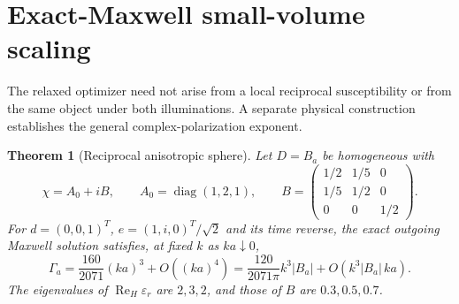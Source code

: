 \documentclass[11pt]{article}
\newtheorem{theorem}{Theorem}[section]
\newcommand{\ReH}{\operatorname{Re}_{\!H}}
\newcommand{\abs}[1]{\lvert #1\rvert}
\begin{document}
\section{Exact-Maxwell small-volume scaling}\label{sec:sphere}
The relaxed optimizer need not arise from a local reciprocal susceptibility or from the same object under both illuminations. A separate physical construction establishes the general complex-polarization exponent.

\begin{theorem}[Reciprocal anisotropic sphere]\label{thm:sphere}
Let $D=B_a$ be homogeneous with
\begin{equation}\label{eq:sphere-tensor}
 \chi=A_0+iB,\qquad A_0=\operatorname{diag}(1,2,1),\qquad
 B=\begin{pmatrix}1/2&1/5&0\\1/5&1/2&0\\0&0&1/2\end{pmatrix}.
\end{equation}
For $d=(0,0,1)^T$, $e=(1,i,0)^T/\sqrt2$ and its time reverse, the exact outgoing Maxwell solution satisfies, at fixed $k$ as $ka\downarrow0$,
\begin{equation}\label{eq:sphere-asymptotic}
 \Gamma_a=\frac{160}{2071}(ka)^3+O((ka)^4)
 =\frac{120}{2071\pi}k^3\abs{B_a}
       +O(k^3\abs{B_a}\,ka).
\end{equation}
The eigenvalues of $\ReH\varepsilon_r$ are $2,3,2$, and those of $B$ are $0.3,0.5,0.7$.
\end{theorem}
\end{document}
